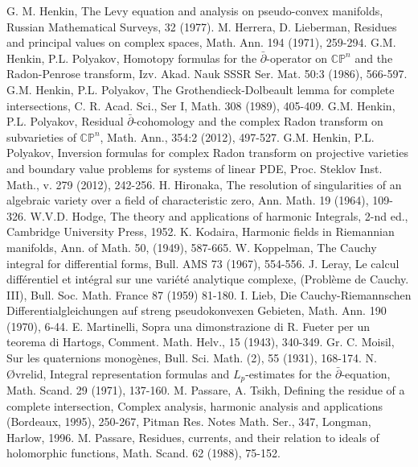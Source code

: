 \documentclass[11pt,reqno]{amsart}
\numberwithin{equation}{section}
\begin{document}
\begin{thebibliography}{WIDT}
 G. M. Henkin, The Levy equation and analysis on pseudo-convex manifolds,
Russian Mathematical Surveys, 32 (1977).
 M. Herrera, D. Lieberman, Residues and principal values on complex
spaces, Math. Ann. 194 (1971), 259-294.
 G.M. Henkin, P.L. Polyakov, Homotopy formulas for the
$\bar\partial$-operator on ${{\mathbb C}}{{\mathbb P}}^n$ and the Radon-Penrose transform, 
Izv. Akad. Nauk SSSR Ser. Mat. 50:3 (1986), 566-597.
 G.M. Henkin, P.L. Polyakov, The Grothendieck-Dolbeault lemma
for complete intersections, C. R. Acad. Sci., Ser I, Math. 308 (1989), 405-409.
 G.M. Henkin, P.L. Polyakov, Residual $\bar\partial$-cohomology and
the complex Radon transform on subvarieties of ${{\mathbb C}}{{\mathbb P}}^n$, Math. Ann., 354:2 (2012), 497-527.
 G.M. Henkin, P.L. Polyakov, Inversion formulas for complex Radon transform
on projective varieties and boundary value problems for systems of linear PDE,
Proc. Steklov Inst. Math., v. 279 (2012), 242-256.
 H. Hironaka, The resolution of singularities of an algebraic variety over a field
of characteristic zero, Ann. Math. 19 (1964), 109-326.
 W.V.D. Hodge, The theory and applications of harmonic Integrals, 2-nd ed.,
Cambridge University Press, 1952.
 K. Kodaira, Harmonic fields in Riemannian manifolds, Ann. of Math. 50,
(1949), 587-665.
 W. Koppelman, The Cauchy integral for differential forms, Bull. AMS 73 (1967),
554-556.
 J. Leray, Le calcul diff\'erentiel et int\'egral sur une vari\'et\'e analytique
complexe, (Probl\`eme de Cauchy. III), Bull. Soc. Math. France 87 (1959) 81-180.
 I. Lieb, Die Cauchy-Riemannschen Differentialgleichungen auf streng
pseudokonvexen Gebieten, Math. Ann. 190 (1970), 6-44.
 E. Martinelli, Sopra una dimonstrazione di R. Fueter per un teorema di
Hartogs, Comment. Math. Helv., 15 (1943), 340-349.
 Gr. C. Moisil, Sur les quaternions monog\`enes, Bull. Sci. Math. (2),
55 (1931), 168-174.
 N. \O vrelid, Integral representation formulas and $L_p$-estimates for the $\bar\partial$-equation, Math. Scand. 29 (1971), 137-160.
 M. Passare, A. Tsikh, Defining the residue of a complete intersection,
Complex analysis, harmonic analysis and applications (Bordeaux, 1995), 250-267,
Pitman Res. Notes Math. Ser., 347, Longman, Harlow, 1996.
 M. Passare, Residues, currents, and their relation to ideals of
holomorphic functions, Math. Scand. 62 (1988), 75-152.

\end{thebibliography}
\end{document}
